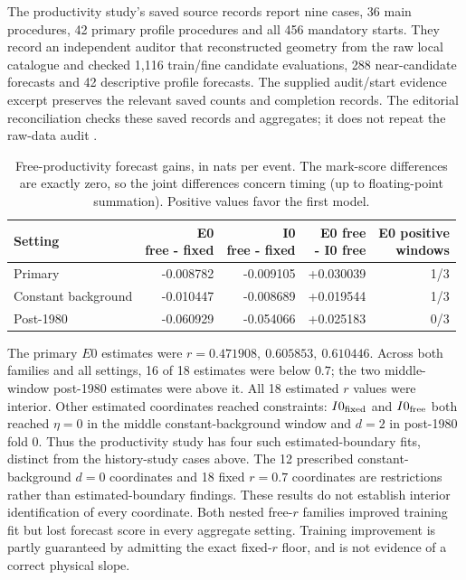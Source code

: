 The productivity study's saved source records report nine cases, 36 main
procedures, 42 primary profile procedures and all 456 mandatory starts.
They record an independent auditor that reconstructed geometry from the
raw local catalogue and checked 1,116 train/fine candidate evaluations,
288 near-candidate forecasts and 42 descriptive profile forecasts. The
supplied audit/start evidence excerpt preserves the relevant saved counts
and completion records. The editorial reconciliation checks these saved
records and aggregates; it does not repeat the raw-data audit
\citep{ProductivitySlopePilot2026}.

\begin{table}[tbp]
\centering\small
\caption{Free-productivity forecast gains, in nats per event. The mark-score
differences are exactly zero, so the joint differences concern timing
(up to floating-point summation). Positive values favor the first model.}
\label{a2:productivity-results}
\begin{tabular}{lrrrr}
\toprule
Setting & \shortstack{E0\\free - fixed} &
\shortstack{I0\\free - fixed} &
\shortstack{E0 free\\- I0 free} &
\shortstack{E0 positive\\windows}\\
\midrule
Primary & -0.008782 & -0.009105 & +0.030039 & 1/3\\
Constant background & -0.010447 & -0.008689 & +0.019544 & 1/3\\
Post-1980 & -0.060929 & -0.054066 & +0.025183 & 0/3\\
\bottomrule
\end{tabular}
\end{table}

The primary \(E0\) estimates were
\(r=0.471908,\ 0.605853,\ 0.610446\). Across both families and all settings,
16 of 18 estimates were below \(0.7\); the two middle-window post-1980
estimates were above it. All 18 estimated \(r\) values were interior.
Other estimated coordinates reached constraints: \(I0_{\rm fixed}\)
and \(I0_{\rm free}\) both reached \(\eta=0\) in the middle
constant-background window and \(d=2\) in post-1980 fold 0. Thus the
productivity study has four such estimated-boundary fits, distinct from
the history-study cases above. The 12 prescribed constant-background \(d=0\) coordinates and 18 fixed
\(r=0.7\) coordinates are restrictions rather than estimated-boundary
findings.
These results do not establish interior identification of every coordinate.
Both nested free-\(r\) families improved training fit but lost forecast
score in every aggregate setting. Training improvement is partly guaranteed by
admitting the exact fixed-\(r\) floor, and is not evidence of a correct
physical slope.

